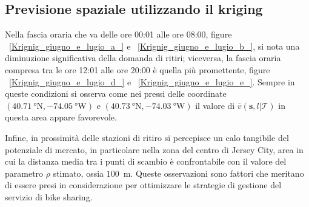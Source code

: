 \subsection{Previsione spaziale utilizzando il kriging}
Nella fascia oraria che va delle ore 00:01 alle ore 08:00, figure ~\ref{Krignig_giugno_e_lugio_a_} e ~\ref{Krignig_giugno_e_lugio_b_}, si nota una diminuzione significativa della domanda di ritiri; viceversa, la fascia oraria compresa tra le ore 12:01 alle ore 20:00 è quella più promettente, figure ~\ref{Krignig_giugno_e_lugio_d_} e ~\ref{Krignig_giugno_e_lugio_e_}. Sempre in queste condizioni si osserva come nei pressi delle coordinate $(\SI{40.71}{\degree} \text{N}, \SI{-74.05}{\degree} \text{W})$ e $(\SI{40.73}{\degree} \text{N}, \SI{-74.03}{\degree} \text{W})$ il valore di $\bar{v}(\mathbf{s}, l |\mathcal{T})$ in questa area appare favorevole.
\par Infine, in prossimità delle stazioni di ritiro si percepisce un calo tangibile del potenziale di mercato, in particolare nella zona del centro di Jersey City, area in cui la distanza media tra i punti di scambio è confrontabile con il valore del parametro $\rho$ stimato, ossia $100$~\unit{\meter}. Queste osservazioni sono fattori che meritano di essere presi in considerazione per ottimizzare le strategie di gestione del servizio di bike sharing.
